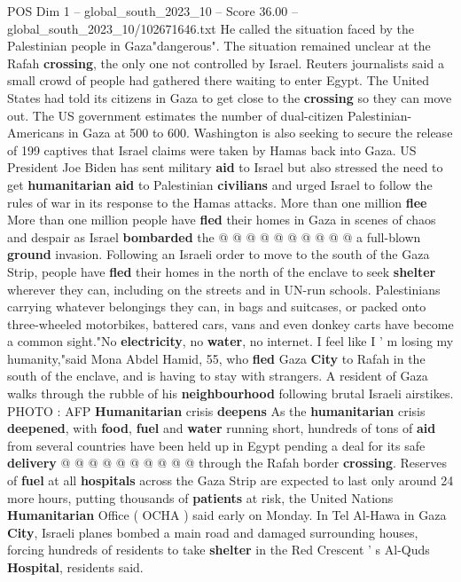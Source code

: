 \begin{textsample}{POS Dim 1 – global\_south\_2023\_10 – Score 36.00 – global\_south\_2023\_10/102671646.txt}
He called the situation faced by the Palestinian people in Gaza"dangerous".
The situation remained unclear at the Rafah \textbf{crossing}, the only one not controlled by Israel.
Reuters journalists said a small crowd of people had gathered there waiting to enter Egypt.
The United States had told its citizens in Gaza to get close to the \textbf{crossing} so they can move out.
The US government estimates the number of dual-citizen Palestinian-Americans in Gaza at 500 to 600.
Washington is also seeking to secure the release of 199 captives that Israel claims were taken by Hamas back into Gaza.
US President Joe Biden has sent military \textbf{aid} to Israel but also stressed the need to get \textbf{humanitarian} \textbf{aid} to Palestinian \textbf{civilians} and urged Israel to follow the rules of war in its response to the Hamas attacks.
More than one million \textbf{flee} More than one million people have \textbf{fled} their homes in Gaza in scenes of chaos and despair as Israel \textbf{bombarded} the @ @ @ @ @ @ @ @ @ @ a full-blown \textbf{ground} invasion.
Following an Israeli order to move to the south of the Gaza Strip, people have \textbf{fled} their homes in the north of the enclave to seek \textbf{shelter} wherever they can, including on the streets and in UN-run schools.
Palestinians carrying whatever belongings they can, in bags and suitcases, or packed onto three-wheeled motorbikes, battered cars, vans and even donkey carts have become a common sight."No \textbf{electricity}, no \textbf{water}, no internet.
I feel like I ' m losing my humanity,"said Mona Abdel Hamid, 55, who \textbf{fled} Gaza \textbf{City} to Rafah in the south of the enclave, and is having to stay with strangers.
A resident of Gaza walks through the rubble of his \textbf{neighbourhood} following brutal Israeli airstikes.
PHOTO : AFP \textbf{Humanitarian} crisis \textbf{deepens} As the \textbf{humanitarian} crisis \textbf{deepened}, with \textbf{food}, \textbf{fuel} and \textbf{water} running short, hundreds of tons of \textbf{aid} from several countries have been held up in Egypt pending a deal for its safe \textbf{delivery} @ @ @ @ @ @ @ @ @ @ through the Rafah border \textbf{crossing}.
Reserves of \textbf{fuel} at all \textbf{hospitals} across the Gaza Strip are expected to last only around 24 more hours, putting thousands of \textbf{patients} at risk, the United Nations \textbf{Humanitarian} Office ( OCHA ) said early on Monday.
In Tel Al-Hawa in Gaza \textbf{City}, Israeli planes bombed a main road and damaged surrounding houses, forcing hundreds of residents to take \textbf{shelter} in the Red Crescent ' s Al-Quds \textbf{Hospital}, residents said.

\end{textsample}
